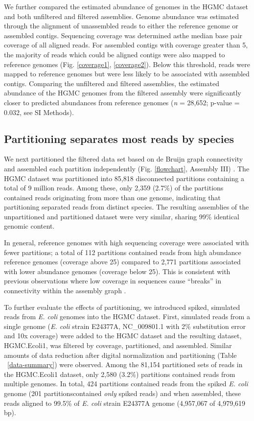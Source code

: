 \documentclass{pnastwo}
\begin{document}
\begin{article}
We further compared the estimated abundance of genomes in the HGMC dataset and
both unfiltered and filtered assemblies. Genome abundance was estimated through
the alignment of unassembled reads to either the reference genome or assembled
contigs. Sequencing coverage was determined asthe median base pair coverage of
all aligned reads. For assembled contigs with coverage greater than 5, the
majority of reads which could be aligned contigs were also mapped to reference
genomes (Fig. \ref{coverage1}, \ref{coverage2}). Below this threshold, reads were mapped to reference
genomes but were less likely to be associated with assembled contigs. Comparing
the unfiltered and filtered assemblies, the estimated abundance of the HGMC
genomes from the filtered assembly were significantly closer to predicted
abundances from reference genomes (\emph{n} = 28,652; p-value = 0.032, see SI
Methods).

\subsection*{Partitioning separates most reads by species} We next partitioned
the filtered data set based on de Bruijn graph connectivity and assembled each
partition independently (Fig. \ref{flowchart}, Assembly III) . The HGMC dataset
was partitioned into 85,818 disconnected partitions containing a total of 9
million reads. Among these, only 2,359 (2.7\%) of the partitions contained reads
originating from more than one genome, indicating that partitioning separated
reads from distinct species. The resulting assemblies of the unpartitioned and
partitioned dataset were very similar, sharing 99\% identical genomic content.

In general, reference genomes with high sequencing coverage were associated with
fewer partitions; a total of 112 partitions contained reads from
high abundance reference genomes (coverage above 25) compared to 2,771
partitions associated with lower abundance genomes (coverage below 25). This is
consistent with previous observations where low coverage in sequences cause
``breaks'' in connectivity within the assembly graph
\cite{Chaisson:2008p1373,Pevzner:2001p1374}.

To further evaluate the effects of partitioning, we introduced spiked, simulated
reads from \emph{E. coli} genomes into the HGMC dataset. First, simulated reads
from a single genome (\emph{E. coli} strain E24377A, NC\_009801.1 with 2\%
substitution error and 10x coverage) were added to the HGMC dataset and the
resulting dataset, HGMC.Ecoli1, was filtered by coverage, partitioned, and
assembled. Similar amounts of data reduction after digital normalization and
partitioning (Table ~\ref{data-summary}) were observed. Among the 81,154
partitioned sets of reads in the HGMC.Ecoli1 dataset, only 2,580 (3.2\%)
partitions contained reads from multiple genomes. In total, 424 partitions
contained reads from the spiked \emph{E. coli} genome (201 partitionscontained
\emph{only} spiked reads) and when assembled, these reads aligned to 99.5\% of
\emph{E. coli} strain E24377A genome (4,957,067 of 4,979,619 bp).


\end{article}
\end{document}
